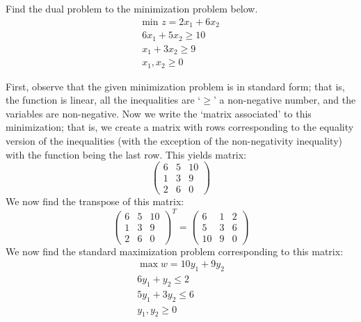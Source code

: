 \documentclass[11pt,letterpaper]{article}
\begin{document}
\newpage



 Find the dual problem to the minimization problem below. 
	\[
	\begin{gathered}
	\text{min } z= 2x_1 + 6x_2 \\
	6x_1 + 5x_2 \geq 10 \\
	x_1 + 3x_2 \geq 9 \\ 
	x_1, x_2 \geq 0
	\end{gathered}
	\] \pspace

\sol First, observe that the given minimization problem is in standard form; that is, the function is linear, all the inequalities are `$\geq$' a non-negative number, and the variables are non-negative. Now we write the `matrix associated' to this minimization; that is, we create a matrix with rows corresponding to the equality version of the inequalities (with the exception of the non-negativity inequality) with the function being the last row. This yields matrix:
	\[
	\begin{pmatrix}
	6 & 5 & 10 \\
	1 & 3 & 9 \\
	2 & 6 & 0 
	\end{pmatrix}
	\]
We now find the transpose of this matrix: 
	\[
	\begin{pmatrix}
	6 & 5 & 10 \\
	1 & 3 & 9 \\
	2 & 6 & 0 
	\end{pmatrix}^T= 
	\begin{pmatrix}
	6 & 1 & 2 \\
	5 & 3 & 6 \\
	10 & 9 & 0 
	\end{pmatrix}
	\]
We now find the standard maximization problem corresponding to this matrix:
	\[
	\begin{gathered}
	\max w= 10y_1 + 9y_2 \\
	6y_1 + y_2 \leq 2 \\
	5y_1 + 3y_2 \leq 6 \\
	y_1, y_2 \geq 0
	\end{gathered}
	\]
\end{document}
